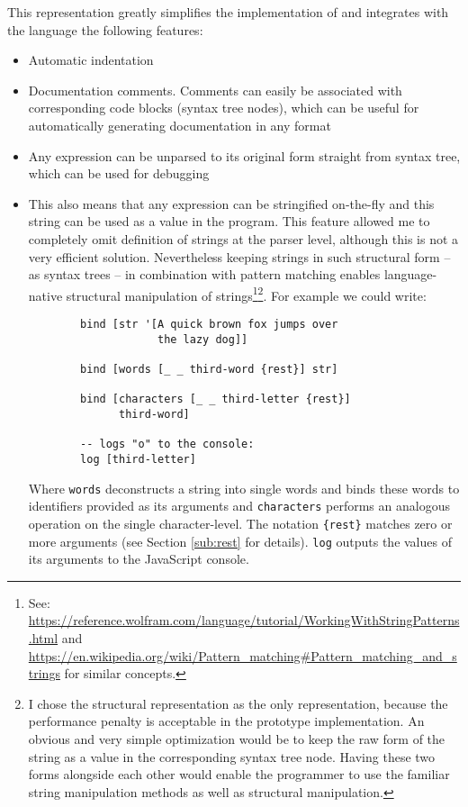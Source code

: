 This representation greatly simplifies the implementation of and integrates with the language the following features:
\begin{itemize}
    \item Automatic indentation
    \item Documentation comments. Comments can easily be associated with corresponding code blocks (syntax tree nodes), which can be useful for automatically generating documentation in any format
    \item Any expression can be unparsed to its original form straight from syntax tree, which can be used for debugging
    \item This also means that any expression can be stringified on-the-fly and this string can be used as a value in the program. This feature allowed me to completely omit definition of strings at the parser level, although this is not a very efficient solution. Nevertheless keeping strings in such structural form -- as syntax trees -- in combination with pattern matching enables language-native structural manipulation of strings\footnote{See: \url{https://reference.wolfram.com/language/tutorial/WorkingWithStringPatterns.html} and \url{https://en.wikipedia.org/wiki/Pattern_matching\#Pattern_matching_and_strings} for similar concepts.}\footnote{I chose the structural representation as the only representation, because the performance penalty is acceptable in the prototype implementation. An obvious and very simple optimization would be to keep the raw form of the string as a value in the corresponding syntax tree node. Having these two forms alongside each other would enable the programmer to use the familiar string manipulation methods as well as structural manipulation.}. For example we could write:
    \begin{lstlisting}
        bind [str '[A quick brown fox jumps over
                    the lazy dog]]
                    
        bind [words [_ _ third-word {rest}] str]
        
        bind [characters [_ _ third-letter {rest}]
              third-word]
        
        -- logs "o" to the console:
        log [third-letter]
    \end{lstlisting}
    
Where \texttt{words} deconstructs a string into single words and binds these words to identifiers provided as its arguments and \texttt{characters} performs an analogous operation on the single character-level. The notation \texttt{\{rest\}} matches zero or more arguments (see Section \ref{sub:rest} for details). \texttt{log} outputs the values of its arguments to the JavaScript console.
\end{itemize}

